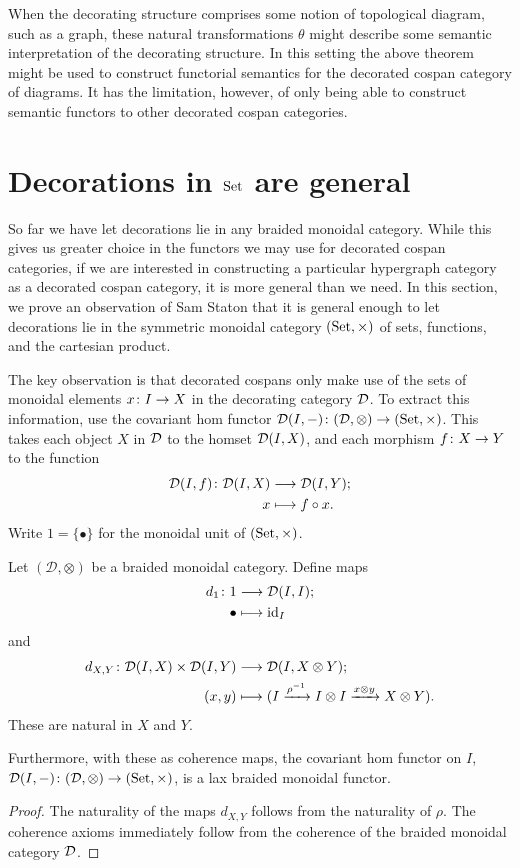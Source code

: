 When the decorating structure comprises some notion of topological diagram, such
as a graph, these natural transformations $\theta$ might describe some semantic
interpretation of the decorating structure. In this setting the above theorem
might be used to construct functorial semantics for the decorated cospan
category of diagrams. It has the limitation, however, of only being able to
construct semantic functors to other decorated cospan categories. 

\section{Decorations in $\mathrm{Set}$ are general} \label{sec.setdecs}

So far we have let decorations lie in any braided monoidal category. While this
gives us greater choice in the functors we may use for decorated cospan
categories, if we are interested in constructing a particular hypergraph
category as a decorated cospan category, it is more general than we need. In
this section, we prove an observation of Sam Staton that it is general enough to
let decorations lie in the symmetric monoidal category $(\mathrm{Set},\times)$ of sets,
functions, and the cartesian product. 

The key observation is that decorated cospans only make use of the sets of
monoidal elements $x{\colon} I \to X$ in the decorating category $\mathcal D$. To
extract this information, use the covariant hom functor $\mathcal D(I,-){\colon} (\mathcal
D,\otimes) \to (\mathrm{Set},\times)$. This takes each object $X$ in $\mathcal D$ to the homset
$\mathcal D(I,X)$, and each morphism $f{\colon} X \to Y$ to the function 
\begin{align*}
  \mathcal D(I,f){\colon} \mathcal D(I,X) &\longrightarrow \mathcal D(I,Y); \\ 
  x &\longmapsto f \circ x.
\end{align*}
Write $1=\{\bullet\}$ for the monoidal unit of $(\mathrm{Set},\times)$.

\begin{proposition}
  Let $(\mathcal D, \otimes)$ be a braided monoidal category. Define maps  
  \begin{align*}
    d_1{\colon} 1 &\longrightarrow \mathcal D(I,I); \\
    \bullet &\longmapsto \mathrm{id}_I
  \end{align*}
  and
  \begin{align*}
    d_{X,Y} {\colon} \mathcal D(I,X) \times \mathcal D(I,Y) &\longrightarrow \mathcal D(I, X \otimes
    Y);\\
    (x,y) &\longmapsto (I \xrightarrow{\rho^{-1}} I \otimes I \xrightarrow{x \otimes y} X \otimes
    Y).
  \end{align*}
  These are natural in $X$ and $Y$. 

  Furthermore, with these as coherence maps, the covariant hom functor on $I$,
  $\mathcal D(I,-){\colon} (\mathcal D,\otimes) \to (\mathrm{Set},\times)$, is a lax braided monoidal
  functor. 
\end{proposition}
\begin{proof}
  The naturality of the maps $d_{X,Y}$ follows from the naturality of $\rho$.
  The coherence axioms immediately follow from the coherence of the braided
  monoidal category $\mathcal D$.
\end{proof}

